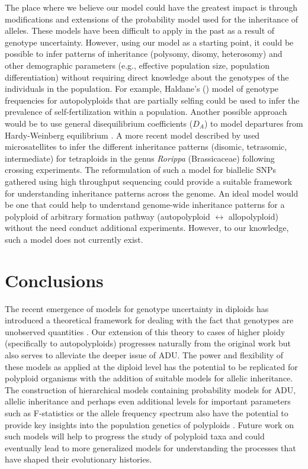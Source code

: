 \documentclass[11pt,english,letterpaper,oneside]{article}
\begin{document}
The place where we believe our model could have the greatest impact is through modifications and extensions of the probability model used for the inheritance of alleles. These models have been difficult to apply in the past as a result of genotype uncertainty. However, using our model as a starting point, it could be possible to infer patterns of inheritance (polysomy, disomy, heterosomy) and other demographic parameters (e.g., effective population size, population differentiation) without requiring direct knowledge about the genotypes of the individuals in the population. For example, Haldane's (\citeyear{haldane1930autopolyploids}) model of genotype frequencies for autopolyploids that are partially selfing could be used to infer the prevalence of self-fertilization within a population. Another possible approach would be to use general disequilibrium coefficients ($D_A$) to model departures from Hardy-Weinberg equilibrium \citep{hernandez1989disequilibrium,weir1996GeneticDataAnalysisII}. A more recent model described by \cite{stift2008polyploidInheritance} used microsatellites to infer the different inheritance patterns (disomic, tetrasomic, intermediate) for tetraploids in the genus \textit{Rorippa} (Brassicaceae) following crossing experiments. The reformulation of such a model for biallelic SNPs gathered using high throughput sequencing could provide a suitable framework for understanding inheritance patterns across the genome. An ideal model would be one that could help to understand genome-wide inheritance patterns for a polyploid of arbitrary formation pathway (autopolyploid $\leftrightarrow$ allopolyploid) without the need conduct additional experiments. However, to our knowledge, such a model does not currently exist. 
\medskip

\section{Conclusions}      %

The recent emergence of models for genotype uncertainty in diploids has introduced a theoretical framework for dealing with the fact that genotypes are unobserved quantities \citep{gompert2012bgc,buerkle2013popModels}. Our extension of this theory to cases of higher ploidy (specifically to autopolyploids) progresses naturally from the original work but also serves to alleviate the deeper issue of ADU. The power and flexibility of these models as applied at the diploid level has the potential to be replicated for polyploid organisms with the addition of suitable models for allelic inheritance. The construction of hierarchical models containing probability models for ADU, allelic inheritance and perhaps even additional levels for important parameters such as F-statistics or the allele frequency spectrum also have the potential to provide key insights into the population genetics of polyploids \citep{gompert2011bamova,buerkle2013popModels}. Future work on such models will help to progress the study of polyploid taxa and could eventually lead to more generalized models for understanding the processes that have shaped their evolutionary histories.
\medskip
\end{document}
